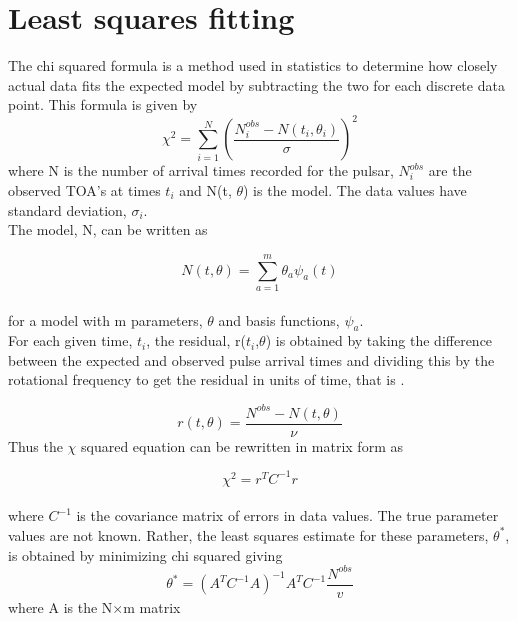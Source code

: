 \documentclass[12pt]{article}
\begin{document}
	\section{Least squares fitting}
	
	The chi squared formula is a method used in statistics to determine how closely actual data fits the expected model by subtracting the two for each discrete data point. This formula is given by
	\begin{equation}\label{chi squared sum form}
	\chi^2={\sum_{i=1}^{N} (\frac{N_i^{obs}-N(t_i,\theta_i)}{\sigma})}^2
	\end{equation}
	where N is the number of arrival times recorded for the pulsar, $N_i^{obs}$ are the observed TOA's at times $t_i$ and N(t, $\theta$) is the model. The data values have standard deviation, $\sigma_i$.\\
	The model, N, can be written as 
	
	\begin{equation}\label{model N}
	N(t,\theta)={\sum_{a=1}^{m}\theta_a \psi_a (t)}
	\end{equation}\\
	for a model with m parameters, $\theta$ and basis functions, $\psi_a$.\\
	For each given time, $t_i$, the residual, r($t_i$,$\theta$) is obtained by taking the difference between the expected and observed pulse arrival times and dividing this by the rotational frequency to get the residual in units of time, that is \cite{kopeikin1999millisecond}.
	
	\begin{equation}\label{residual r relating to model N}
	r(t,\theta)=\frac{N^{obs}-N(t,\theta)}{\nu}
	\end{equation}
	Thus the $\chi$ squared equation can be rewritten in matrix form as
	
	\begin{equation}\label{chi squared matrix form}
	\chi^2=r^{T}C^{-1}r
	\end{equation}\\
	where $C^{-1}$ is the covariance matrix of errors in data values. 
	The true parameter values are not known. Rather, the least squares estimate for these parameters, $\theta^*$, is obtained by minimizing chi squared giving 
	\begin{equation}\label{theta parameter equation}
	\theta^*=(A^{T}C^{-1}A)^{-1}A^{T}C^{-1}\frac{N^{obs}}{v}
	\end{equation}
	where A is the N$\times$m matrix 
	
\end{document}
